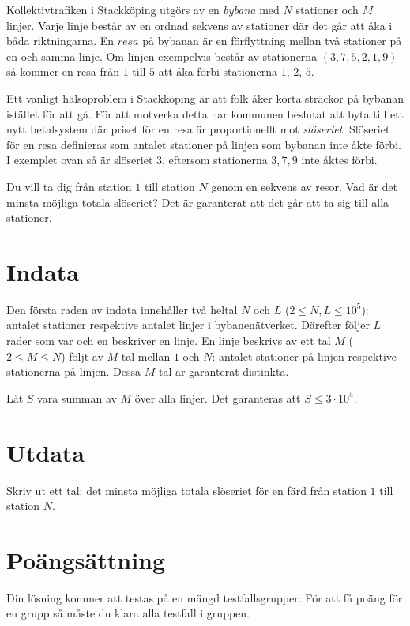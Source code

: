 
Kollektivtrafiken i Stackköping utgörs av en \textit{bybana} med $N$ stationer och $M$ linjer.
Varje linje består av en ordnad sekvens av stationer där det går att åka i båda riktningarna.
En $\textit{resa}$ på bybanan är en förflyttning mellan två stationer på en och samma linje. 
Om linjen exempelvis består av stationerna $(3,7,5,2,1,9)$ så kommer en resa från $1$ till $5$
att åka förbi stationerna $1$, $2$, $5$.

Ett vanligt hälsoproblem i Stackköping är att folk åker korta sträckor på bybanan istället
för att gå. För att motverka detta har kommunen beslutat att byta till ett nytt betalsystem 
där priset för en resa är proportionellt mot \textit{slöseriet}. Slöseriet för en resa 
definieras som antalet stationer på linjen som bybanan inte åkte förbi. I exemplet ovan så 
är slöseriet $3$, eftersom stationerna $3,7,9$ inte åktes förbi.

Du vill ta dig från station $1$ till station $N$ genom en sekvens av resor.
Vad är det minsta möjliga totala slöseriet?
Det är garanterat att det går att ta sig till alla stationer.

\section*{Indata}

Den första raden av indata innehåller två heltal $N$ och $L$ ($2 \le N,L \le 10^5$): 
antalet stationer respektive antalet linjer i bybanenätverket.
Därefter följer $L$ rader som var och en beskriver en linje. En linje beskrivs
av ett tal $M$ ($2 \le M \le N$) följt av $M$ tal mellan $1$ och $N$: antalet stationer på
linjen respektive stationerna på linjen. Dessa $M$ tal är garanterat distinkta.

Låt $S$ vara summan av $M$ över alla linjer. Det garanteras att $S \le 3\cdot 10^5$.

\section*{Utdata}

Skriv ut ett tal: det minsta möjliga totala slöseriet för en färd från station $1$ till
station $N$.

\section*{Poängsättning}
Din lösning kommer att testas på en mängd testfallsgrupper.
För att få poäng för en grupp så måste du klara alla testfall i gruppen.


